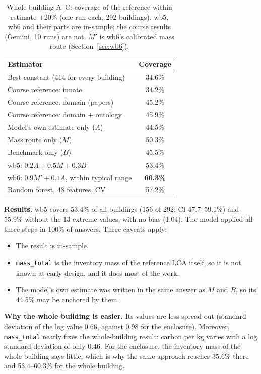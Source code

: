 \documentclass[10pt,letterpaper]{article}
\begin{document}
\begin{table}[t]
\centering\footnotesize
\caption{Whole building A--C: coverage of the reference within estimate $\pm$20\% (one run each, 292 buildings). wb5, wb6 and their parts are in-sample; the course results (Gemini, 10 runs) are not. $M'$ is wb6's calibrated mass route (Section~\ref{sec:wb6}).}
\label{tab:wb}
\setlength{\tabcolsep}{4pt}
\begin{tabular}{lc}
\toprule
Estimator & Coverage \\
\midrule
Best constant (414 for every building) & 34.6\% \\
Course reference: innate & 34.2\% \\
Course reference: domain (papers) & 45.2\% \\
Course reference: domain + ontology & 45.9\% \\
\midrule
Model's own estimate only ($A$) & 44.5\% \\
Mass route only ($M$) & 50.3\% \\
Benchmark only ($B$) & 45.5\% \\
wb5: $0.2A+0.5M+0.3B$ & 53.4\% \\
wb6: $0.9M'+0.1A$, within typical range & \textbf{60.3\%} \\
\midrule
Random forest, 48 features, CV & 57.2\% \\
\bottomrule
\end{tabular}
\end{table}

\textbf{Results.} wb5 covers 53.4\% of all buildings (156 of 292; CI 47.7--59.1\%) and 55.9\% without the 13 extreme values, with no bias (1.04). The model applied all three steps in 100\% of answers. Three caveats apply:
\begin{itemize}
\item The result is in-sample.
\item \texttt{mass\_total} is the inventory mass of the reference LCA itself, so it is not known at early design, and it does most of the work.
\item The model's own estimate was written in the same answer as $M$ and $B$, so its 44.5\% may be anchored by them.
\end{itemize}

\textbf{Why the whole building is easier.} Its values are less spread out (standard deviation of the log value 0.66, against 0.98 for the enclosure). Moreover, \texttt{mass\_total} nearly fixes the whole-building result: carbon per kg varies with a log standard deviation of only 0.46. For the enclosure, the inventory mass of the whole building says little, which is why the same approach reaches 35.6\% there and 53.4--60.3\% for the whole building.
\end{document}
